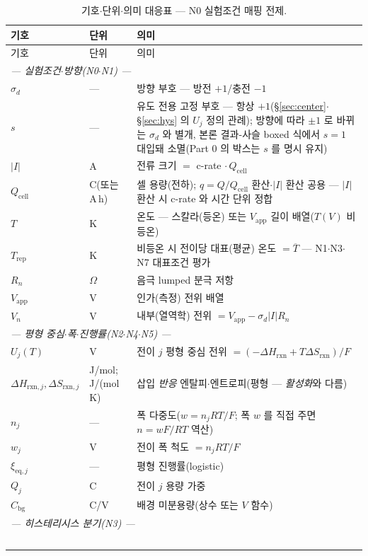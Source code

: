 \documentclass[11pt,a4paper]{article}
\newcommand{\eq}{\mathrm{eq}}
\newcommand{\app}{\mathrm{app}}
\newcommand{\cell}{\mathrm{cell}}
\newcommand{\bg}{\mathrm{bg}}
\newcommand{\rxn}{\mathrm{rxn}}
\newcommand{\rep}{\mathrm{rep}}
\begin{document}
\begin{longtable}{p{} p{} p{}}
\caption{기호$\cdot$단위$\cdot$의미 대응표 --- N0 실험조건 매핑 전제.}\label{tab:notation}\\
\toprule 기호 & 단위 & 의미 \\ \midrule \endfirsthead
\toprule 기호 & 단위 & 의미 \\ \midrule \endhead
\multicolumn{3}{l}{\emph{— 실험조건$\cdot$방향(N0$\cdot$N1) —}}\\
$\sigma_d$ & --- & 방향 부호 — 방전 $+1$/충전 $-1$ \\
$s$ & --- & 유도 전용 고정 부호 — 항상 $+1$(\S\ref{sec:center}$\cdot$\S\ref{sec:hys} 의 $U_j$ 정의 관례); 방향에 따라 $\pm1$ 로 바뀌는 $\sigma_d$ 와 별개, 본론 결과-사슬 boxed 식에서 $s{=}1$ 대입돼 소멸(Part 0 의 박스는 $s$ 를 명시 유지) \\
$|I|$ & A & 전류 크기 $=$ c-rate$\,\cdot Q_\cell$ \\
$Q_\cell$ & C(또는 A\,h) & 셀 용량(전하); $q=Q/Q_\cell$ 환산$\cdot$$|I|$ 환산 공용 — $|I|$ 환산 시 c-rate 와 시간 단위 정합 \\
$T$ & K & 온도 — 스칼라(등온) 또는 $V_\app$ 길이 배열($T(V)$ 비등온) \\
$T_\rep$ & K & 비등온 시 전이당 대표(평균) 온도 $=\overline T$ — N1$\cdot$N3$\cdot$N7 대표조건 평가 \\
$R_n$ & $\Omega$ & 음극 lumped 분극 저항 \\
$V_\app$ & V & 인가(측정) 전위 배열 \\
$V_n$ & V & 내부(열역학) 전위 $=V_\app-\sigma_d|I|R_n$ \\
\multicolumn{3}{l}{\emph{— 평형 중심$\cdot$폭$\cdot$진행률(N2$\cdot$N4$\cdot$N5) —}}\\
$U_j(T)$ & V & 전이 $j$ 평형 중심 전위 $=(-\Delta H_\rxn+T\Delta S_\rxn)/F$ \\
$\Delta H_{\rxn,j},\Delta S_{\rxn,j}$ & {\footnotesize J/mol;\,J/(mol\,K)} & 삽입 \emph{반응} 엔탈피$\cdot$엔트로피(평형 — \emph{활성화}와 다름) \\
$n_j$ & --- & 폭 다중도($w=n_jRT/F$; 폭 $w$ 를 직접 주면 $n=wF/RT$ 역산) \\
$w_j$ & V & 전이 폭 척도 $=n_jRT/F$ \\
$\xi_{\eq,j}$ & --- & 평형 진행률(logistic) \\
$Q_j$ & C & 전이 $j$ 용량 가중 \\
$C_\bg$ & C/V & 배경 미분용량(상수 또는 $V$ 함수) \\
\multicolumn{3}{l}{\emph{— 히스테리시스 분기(N3) —}}\\
$$
\end{longtable}
\end{document}
